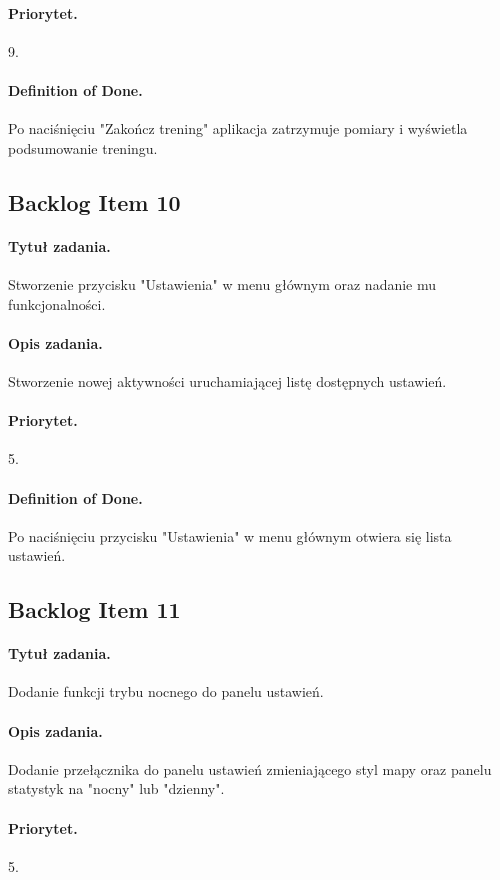 \documentclass[a4paper]{article}
\begin{document}
\paragraph{Priorytet.} 9.
\paragraph{Definition of Done.} Po naciśnięciu "Zakończ trening" aplikacja zatrzymuje pomiary i wyświetla podsumowanie treningu.

\subsection{Backlog Item 10}
\paragraph{Tytuł zadania.} Stworzenie przycisku "Ustawienia" w menu głównym oraz nadanie mu funkcjonalności.
\paragraph{Opis zadania.} Stworzenie nowej aktywności uruchamiającej listę dostępnych ustawień.
\paragraph{Priorytet.} 5.
\paragraph{Definition of Done.} Po naciśnięciu przycisku "Ustawienia" w menu głównym otwiera się lista ustawień.

\subsection{Backlog Item 11}
\paragraph{Tytuł zadania.} Dodanie funkcji trybu nocnego do panelu ustawień.
\paragraph{Opis zadania.} Dodanie przełącznika do panelu ustawień zmieniającego styl mapy oraz panelu statystyk na "nocny" lub "dzienny".
\paragraph{Priorytet.} 5.
\end{document}
